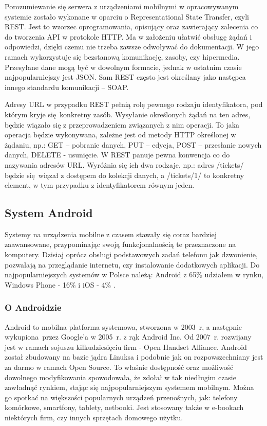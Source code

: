 Porozumiewanie się serwera z urządzeniami mobilnymi w opracowywanym systemie zostało wykonane w oparciu o Representational State Transfer, czyli REST. Jest to wzorzec oprogramowania, opisujący oraz zawierający zalecenia co do tworzenia API w protokole HTTP. Ma w założeniu ułatwić obsługę żądań i odpowiedzi, dzięki czemu nie trzeba zawsze odwoływać do dokumentacji. W jego ramach wykorzystuje się bezstanową komunikację, zasoby, czy hipermedia. Przesyłane dane mogą być w dowolnym formacie, jednak w ostatnim czasie najpopularniejszy jest JSON. Sam REST często jest określany jako następca innego standardu komunikacji -- SOAP.

Adresy URL w przypadku REST pełnią rolę pewnego rodzaju identyfikatora, pod którym kryje się konkretny zasób. Wysyłanie określonych żądań na ten adres, będzie wiązało się z przeprowadzeniem związanych z nim operacji. To jaka operacja będzie wykonywana, zależne jest od metody HTTP określonej w żądaniu, np.: GET -- pobranie danych, PUT -- edycja, POST -- przesłanie nowych danych, DELETE - usunięcie. W REST panuje pewna konwencja co do nazywania adresów URL. Wyróżnia się ich dwa rodzaje, np.: adres /tickets/ będzie się wiązał z dostępem do kolekcji danych, a /tickets/1/ to konkretny element, w tym przypadku z identyfikatorem równym jeden.

\subsection{System Android}

Systemy na urządzenia mobilne z czasem stawały się coraz bardziej zaawansowane, przypominając swoją funkcjonalnością te przeznaczone na komputery. Dzisiaj oprócz obsługi podstawowych zadań telefonu jak dzwonienie, pozwalają na przeglądanie internetu, czy instalowanie dodatkowych aplikacji. Do najpopularniejszych systemów w Polsce należą: Android z 65\% udziałem w rynku, Windows Phone - 16\% i iOS - 4\% \cite{polska_jest_mobi}.

\subsubsection*{O Androidzie}

Android to mobilna platforma systemowa, stworzona w 2003~r, a następnie wykupiona przez Google'a w 2005~r. z rąk Android Inc. Od 2007~r. rozwijany jest w ramach sojuszu kilkudziesięciu firm - Open Handset Alliance. Android został zbudowany na bazie jądra Linuksa i podobnie jak on rozpowszechniany jest za darmo w ramach Open Source. To właśnie dostępność oraz możliwość dowolnego modyfikowania spowodowała, że zdołał w tak niedługim czasie zawładnąć rynkiem, stając się najpopularniejszym systemem mobilnym. Można go spotkać na większości popularnych urządzeń przenośnych, jak: telefony komórkowe, smartfony, tablety, netbooki. Jest stosowany także w e-bookach niektórych firm, czy innych sprzętach domowego użytku. 


